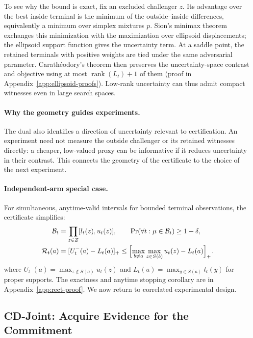 \documentclass{article}
\theoremstyle{plain}
\theoremstyle{definition}
\begin{document}
To see why the bound is exact, fix an excluded challenger $z$.
Its advantage over the best inside terminal is the minimum
of the outside--inside differences, equivalently a minimum
over simplex mixtures $p$. Sion's minimax theorem exchanges
this minimization with the maximization over ellipsoid
displacements; the ellipsoid support function gives the
uncertainty term. At a saddle point, the retained terminals
with positive weights are tied under the same adversarial
parameter. Carath\'eodory's theorem then preserves the
uncertainty-space contrast and objective using at most
$\operatorname{rank}(L_t)+1$ of them (proof in
Appendix~\ref{app:ellipsoid-proofs}). Low-rank uncertainty
can thus admit compact witnesses even in large search spaces.

\paragraph{Why the geometry guides experiments.}
The dual also identifies a direction of uncertainty relevant
to certification. An experiment need not measure the outside
challenger or its retained witnesses directly: a cheaper,
low-valued proxy can be informative if it reduces uncertainty
in their contrast. This connects the geometry of the
certificate to the choice of the next experiment.

\paragraph{Independent-arm special case.}
For simultaneous, anytime-valid intervals for bounded
terminal observations, the certificate simplifies:
\begin{align}
 \mathcal B_t&=\prod_{z\in Z}[l_t(z),u_t(z)],\qquad
 \Pr(\forall t:\mu\in\mathcal B_t)\ge1-\delta,
 \label{eq:terminal-box}\\
 \mathcal R_t(a)&=[U_t^-(a)-L_t(a)]_+
 \le\Bigl[\max_{b\ne a}\max_{z\in S(b)}u_t(z)-L_t(a)\Bigr]_+.
 \label{eq:exact-robust-regret}
\end{align}
where $U_t^-(a)=\max_{z\notin S(a)}u_t(z)$ and
$L_t(a)=\max_{y\in S(a)}l_t(y)$ for proper supports.
The exactness and anytime stopping corollary are in
Appendix~\ref{app:rect-proof}. We now return to correlated
experimental design.


\subsection{CD-Joint: Acquire Evidence for the Commitment}
\label{sec:acquisition}
\end{document}
